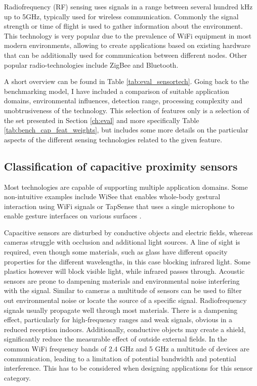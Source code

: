 Radiofrequency (RF) sensing uses signals in a range between several hundred kHz up to 5GHz, typically used for wireless communication. Commonly the signal strength or time of flight is used to gather information about the environment. This technology is very popular due to the prevalence of WiFi equipment in most modern environments, allowing to create applications based on existing hardware that can be additionally used for communication between different nodes. Other popular radio-technologies include ZigBee and Bluetooth.

A short overview can be found in Table \ref{tab:eval_sensortech}. Going back to the benchmarking model, I have included a comparison of suitable application domains, environmental influences, detection range, processing complexity and unobtrusiveness of the technology. This selection of features only is a selection of the set presented in Section \ref{ch:eval} and more specifically Table \ref{tab:bench_cap_feat_weights}, but includes some more details on the particular aspects of the different sensing technologies related to the given feature.

\subsection{Classification of capacitive proximity sensors}
Most technologies are capable of supporting multiple application domains. Some non-intuitive examples include WiSee that enables whole-body gestural interaction using WiFi signals \cite{pu2013whole} or TapSense that uses a single microphone to enable gesture interfaces on various surfaces \cite{harrison2011tapsense}. 

Capacitive sensors are disturbed by conductive objects and electric fields, whereas cameras struggle with occlusion and additional light sources. A line of sight is required, even though some materials, such as glass have different opacity properties for the different wavelengths, in this case blocking infrared light. Some plastics however will block visible light, while infrared passes through. Acoustic sensors are prone to dampening materials and environmental noise interfering with the signal. Similar to cameras a multitude of sensors can be used to filter out environmental noise or locate the source of a specific signal. Radiofrequency signals usually propagate well through most materials. There is a dampening effect, particularly for high-frequency ranges and weak signals, obvious in a reduced reception indoors. Additionally, conductive objects may create a shield, significantly reduce the measurable effect of outside external fields. In the common WiFi frequency bands of 2.4 GHz and 5 GHz a multitude of devices are communication, leading to a limitation of potential bandwidth and potential interference. This has to be considered when designing applications for this sensor category. 

